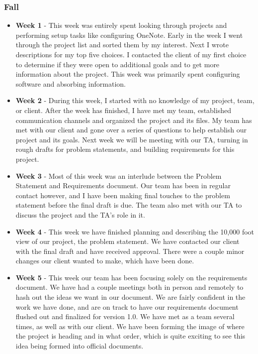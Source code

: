 \documentclass[onecolumn, draftclsnofoot,10pt, compsoc]{IEEEtran}
\begin{document}
			\subsubsection{Fall}
				\begin{itemize}
					\item \textbf{Week 1} - This week was entirely spent looking through projects and performing setup tasks like configuring OneNote. Early in the week I went through the project list and sorted them by my interest. Next I wrote descriptions for my top five choices. I contacted the client of my first choice to determine if they were open to additional goals and to get more information about the project. This week was primarily spent configuring software and absorbing information.
					\item \textbf{Week 2} - During this week, I started with no knowledge of my project, team, or client. After the week has finished, I have met my team, established communication channels and organized the project and its files. My team has met with our client and gone over a series of questions to help establish our project and its goals. Next week we will be meeting with our TA, turning in rough drafts for problem statements, and building requirements for this project.
					\item \textbf{Week 3} - Most of this week was an interlude between the Problem Statement and Requirements document. Our team has been in regular contact however, and I have been making final touches to the problem statement before the final draft is due. The team also met with our TA to discuss the project and the TA's role in it.
					\item \textbf{Week 4} - This week we have finished planning and describing the 10,000 foot view of our project, the problem statement. We have contacted our client with the final draft and have received approval. There were a couple minor changes our client wanted to make, which have been done.
					\item \textbf{Week 5} - This week our team has been focusing solely on the requirements document. We have had a couple meetings both in person and remotely to hash out the ideas we want in our document. We are fairly confident in the work we have done, and are on track to have our requirements document flushed out and finalized for version 1.0. We have met as a team several times, as well as with our client. We have been forming the image of where the project is heading and in what order, which is quite exciting to see this idea being formed into official documents.

\end{itemize}
\end{document}

